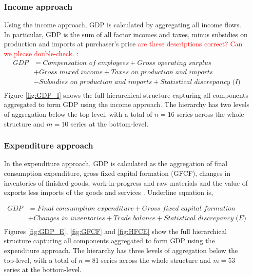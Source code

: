 \documentclass[graybox]{svmult}
\begin{document}
\subsubsection*{Income approach}

Using the income approach, GDP is calculated by aggregating all income flows. In particular, GDP is the sum of all factor incomes and taxes, minus subsidies on production and imports at purchaser's price \textcolor{red}{are these descriptions correct? Can we please double-check.} \citep{ABS2015}:
	\begin{align*}
	\textit{GDP} &= \textit{Compensation of employees} + \textit{Gross operating surplus}\\ &+ \textit{Gross mixed income}+ \textit{Taxes on production and imports}\\ &- \textit{Subsidies on production and imports} + \textit{Statistical discrepancy (I)}\\
	\end{align*}
Figure \ref{fig:GDP_I} shows the full hierarchical structure capturing all components aggregated to form GDP using the income approach. The hierarchy has two levels of aggregation below the top-level, with a total of $n=16$ series across the whole structure and $m=10$ series at the bottom-level.

\subsubsection*{Expenditure approach}

In the expenditure approach, GDP is calculated as the aggregation of final consumption expenditure, gross fixed capital formation (GFCF), changes in inventories of finished goods, work-in-progress and raw materials and the value of exports less imports of the goods and services \citep{ABS2015}. Underline equation is,

\begin{align*}
	\textit{GDP} &= \textit{Final consumption expenditure} + \textit{Gross fixed capital formation} \\ & + \textit{Changes in inventories} + \textit{Trade balance}+\textit{Statistical discrepancy (E)}\\
	\end{align*}
Figures \ref{fig:GDP_E}, \ref{fig:GFCF} and \ref{fig:HFCE} show the full hierarchical structure capturing all components aggregated to form GDP using the expenditure approach. The hierarchy has three levels of aggregation below the top-level, with a total of $n=81$ series across the whole structure and $m=53$ series at the bottom-level.
\end{document}
